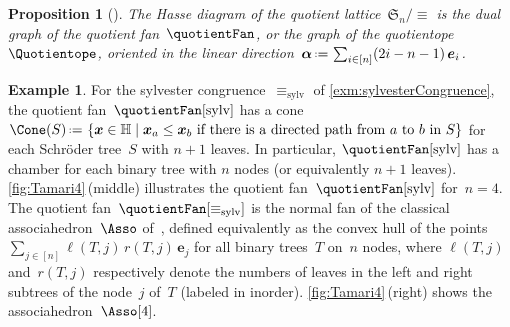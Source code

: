 \documentclass{amsart}
\newtheorem{proposition}[theorem]{Proposition}
\theoremstyle{definition}
\newtheorem{example}[theorem]{Example}
\newcommand{\f}[1]{{\mathfrak{#1}}} %
\renewcommand{\b}[1]{{\boldsymbol{#1}}} %
\newcommand{\set}[2]{\left\{ #1 \;\middle|\; #2 \right\}} %
\newcommand{\eqdef}{\mbox{\,\raisebox{0.2ex}{\scriptsize\ensuremath{\mathrm:}}\ensuremath{=}\,}} %
\newcommand{\hyp}{\mathbb{H}} %
\begin{document}
\begin{proposition}[\cite{Reading-HopfAlgebras, PilaudSantos-quotientopes, PadrolPilaudRitter}]
The Hasse diagram of the quotient lattice~$\f{S}_n / {\equiv}$ is the dual graph of the quotient fan~$\quotientFan$, or the graph of the quotientope~$\Quotientope$, oriented in the linear direction~$\b{\alpha} \eqdef \sum_{i \in [n]} (2i-n-1) \, \b{e}_i$.
\end{proposition}

\begin{example}
\label{exm:sylvesterFanAssociahedron}
For the sylvester congruence~$\equiv_\textrm{sylv}$ of \cref{exm:sylvesterCongruence}, the quotient fan~$\quotientFan[\textrm{sylv}]$ has a cone~$\Cone(S) \eqdef \set{\b{x} \in \hyp}{\b{x}_a \le \b{x}_b \text{ if there is a directed path from } a \text{ to } b \text{ in } S}$ for each Schröder tree~$S$ with $n+1$ leaves.
In particular, $\quotientFan[\textrm{sylv}]$ has a chamber for each binary tree with $n$ nodes (or equivalently $n+1$ leaves).
\cref{fig:Tamari4}\,(middle) illustrates the quotient fan~$\quotientFan[\textrm{sylv}]$ for~$n = 4$.
The quotient fan~$\quotientFan[\equiv_\textrm{sylv}]$ is the normal fan of the classical associahedron~$\Asso$ of~\cite{ShniderSternberg, Loday}, defined equivalently as the convex hull of the points~$\sum_{j \in [n]} \ell(T,j) \, r(T,j) \, \b{e}_j$ for all binary trees~$T$ on~$n$ nodes, where $\ell(T,j)$ and~$r(T,j)$ respectively denote the numbers of leaves in the left and right subtrees of the node~$j$ of~$T$ (labeled in inorder).
\cref{fig:Tamari4}\,(right) shows the associahedron~$\Asso[4]$.
%
\begin{figure}
	\capstart

\end{figure}
\end{example}
\end{document}
